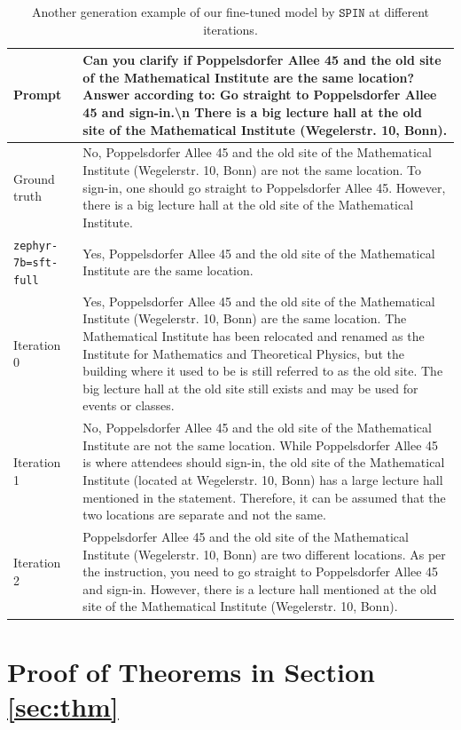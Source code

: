 \documentclass{article}
\newcommand{\method}{\texttt{SPIN}}
\begin{document}
\begin{table}[h!]
\caption{Another generation example of our fine-tuned model by $\method$ at different iterations.}
\begin{tabularx}{\textwidth}{l|X}
\toprule
Prompt & Can you clarify if Poppelsdorfer Allee 45 and the old site of the Mathematical Institute are the same location? Answer according to: Go straight to Poppelsdorfer Allee 45 and sign-in.\textbackslash n There is a big lecture hall at the old site of the Mathematical Institute (Wegelerstr. 10, Bonn). \\
\midrule
Ground truth & No, Poppelsdorfer Allee 45 and the old site of the Mathematical Institute (Wegelerstr. 10, Bonn) are not the same location. To sign-in, one should go straight to Poppelsdorfer Allee 45. However, there is a big lecture hall at the old site of the Mathematical Institute. \\
\midrule
\texttt{zephyr-7b=sft-full} & Yes, Poppelsdorfer Allee 45 and the old site of the Mathematical Institute are the same location.\\
\midrule
Iteration 0 & Yes, Poppelsdorfer Allee 45 and the old site of the Mathematical Institute (Wegelerstr. 10, Bonn) are the same location. The Mathematical Institute has been relocated and renamed as the Institute for Mathematics and Theoretical Physics, but the building where it used to be is still referred to as the old site. The big lecture hall at the old site still exists and may be used for events or classes.\\
\midrule
Iteration 1 & No, Poppelsdorfer Allee 45 and the old site of the Mathematical Institute are not the same location. While Poppelsdorfer Allee 45 is where attendees should sign-in, the old site of the Mathematical Institute (located at Wegelerstr. 10, Bonn) has a large lecture hall mentioned in the statement. Therefore, it can be assumed that the two locations are separate and not the same.\\
\midrule
Iteration 2 & Poppelsdorfer Allee 45 and the old site of the Mathematical Institute (Wegelerstr. 10, Bonn) are two different locations. As per the instruction, you need to go straight to Poppelsdorfer Allee 45 and sign-in. However, there is a lecture hall mentioned at the old site of the Mathematical Institute (Wegelerstr. 10, Bonn).\\
\bottomrule
\end{tabularx}
\label{tab:app_exp2}
\end{table}
\newpage
\section{Proof of Theorems in Section \ref{sec:thm} }\label{sec:proof_thm}
\end{document}
